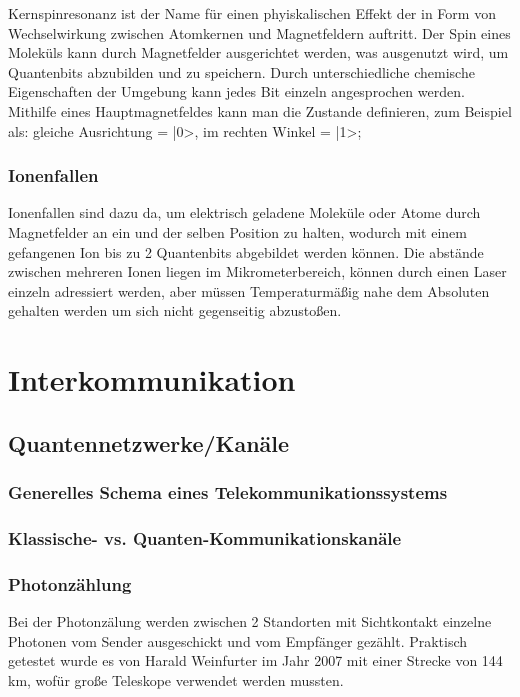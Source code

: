 Kernspinresonanz ist der Name f\"ur einen phyiskalischen Effekt der in Form von Wechselwirkung zwischen Atomkernen und Magnetfeldern auftritt. Der Spin eines Molek\"uls kann durch Magnetfelder ausgerichtet werden, was ausgenutzt wird, um Quantenbits abzubilden und zu speichern. Durch unterschiedliche chemische Eigenschaften der Umgebung kann jedes Bit einzeln angesprochen werden. Mithilfe eines Hauptmagnetfeldes kann man die Zustande definieren, zum Beispiel als: gleiche Ausrichtung = |0>, im rechten Winkel = |1>;

\subsubsection{Ionenfallen}

Ionenfallen sind dazu da, um elektrisch geladene Molek\"ule oder Atome durch Magnetfelder an ein und der selben Position zu halten, wodurch mit einem gefangenen Ion bis zu 2 Quantenbits abgebildet werden k\"onnen. Die abst\"ande zwischen mehreren Ionen liegen im Mikrometerbereich, k\"onnen durch einen Laser einzeln adressiert werden, aber m\"ussen Temperaturm\"aßig nahe dem Absoluten gehalten werden um sich nicht gegenseitig abzustoßen.

\section{Interkommunikation}
\label{sec:Interkommunikation}


\subsection{Quantennetzwerke/Kan\"ale}
\label{sec:Quantennetzwerke/Kanale}

\subsubsection{Generelles Schema eines Telekommunikationssystems}

\subsubsection{Klassische- vs. Quanten-Kommunikationskan\"ale}

\subsubsection{Photonz\"ahlung}

Bei der Photonzälung werden zwischen 2 Standorten mit Sichtkontakt einzelne Photonen vom Sender ausgeschickt und vom Empfänger gezählt. Praktisch getestet wurde es von Harald Weinfurter im Jahr 2007 mit einer Strecke von 144 km, wofür große Teleskope verwendet werden mussten.

